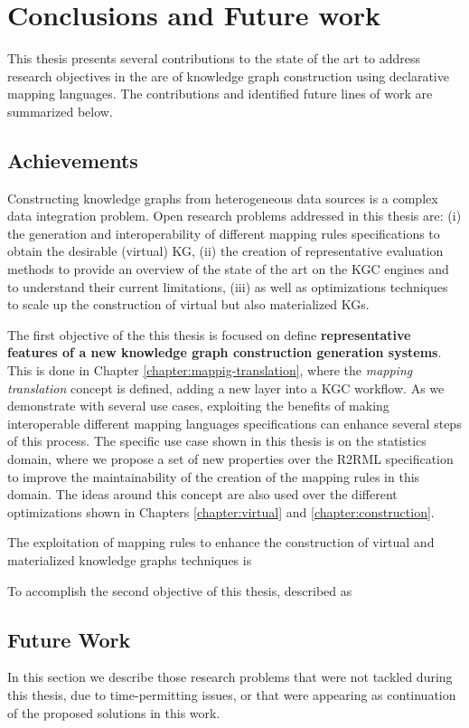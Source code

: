 \chapter{Conclusions and Future work}
\label{chap:conc}
This thesis presents several contributions to the state of the art to address research objectives in the are of knowledge graph construction using declarative mapping languages. The contributions and identified future lines of work are summarized below.


\section{Achievements}
Constructing knowledge graphs from heterogeneous data sources is a complex data integration problem. Open research problems addressed in this thesis are: (i) the generation and interoperability of different mapping rules specifications to obtain the desirable (virtual) KG, (ii) the creation of representative evaluation methods to provide an overview of the state of the art on the KGC engines and to understand their current limitations, (iii) as well as optimizations techniques to scale up the construction of virtual but also materialized KGs. 
 
 
The first objective of the this thesis is focused on define \textbf{representative features of a new knowledge graph construction generation systems}. This is done in Chapter \ref{chapter:mappig-translation}, where the \textit{mapping translation} concept is defined, adding a new layer into a KGC workflow. As we demonstrate with several use cases, exploiting the benefits of making interoperable different mapping languages specifications can enhance several steps of this process. The specific use case shown in this thesis is on the statistics domain, where we propose a set of new properties over the R2RML specification to improve the maintainability of the creation of the mapping rules in this domain. The ideas around this concept are also used over the different optimizations shown in Chapters \ref{chapter:virtual} and \ref{chapter:construction}.

The exploitation of mapping rules to enhance the construction of virtual and materialized knowledge graphs techniques is 

To accomplish the second objective of this thesis, described as \textbf{}





\section{Future Work}
In this section we describe those research problems that were not tackled during this thesis, due to time-permitting issues, or that were appearing as continuation of the proposed solutions in this work.

